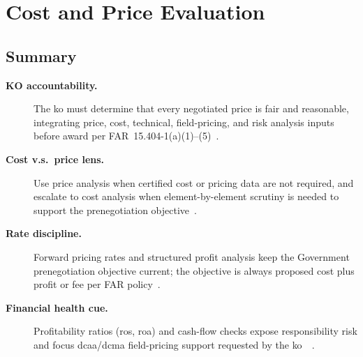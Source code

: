 \documentclass[../main.tex]{subfiles}
\begin{document}
\section{Cost and Price Evaluation}
\minibib

\subsection{Summary}
\begin{description}
\item[\textbf{KO accountability.}] The \ac{ko} must determine that every negotiated price is fair and reasonable, integrating price, cost, technical, field-pricing, and risk analysis inputs before award per FAR~15.404-1(a)(1)--(5)~\autocite[\S~15.404-1(a)]{FAR}.
\item[\textbf{Cost v.s.\ price lens.}] Use price analysis when certified cost or pricing data are not required, and escalate to cost analysis when element-by-element scrutiny is needed to support the prenegotiation objective~\autocite[\S\S~15.404-1(b), 15.404-1(c)]{FAR}.
\item[\textbf{Rate discipline.}] Forward pricing rates and structured profit analysis keep the Government prenegotiation objective current; the objective is always proposed cost plus profit or fee per FAR policy~\autocite[\S\S~15.401, 15.404-4, 15.407-3]{FAR}.
	\item[\textbf{Financial health cue.}] Profitability ratios (\gls{ros}, \gls{roa}) and cash-flow checks expose responsibility risk and focus \gls{dcaa}/\gls{dcma} field-pricing support requested by the \gls{ko}~\autocite[\S~9.104-1]{FAR}~\autocite{edo-3-2-4-cost-price-evaluation-2024}.
\end{description}
\end{document}
